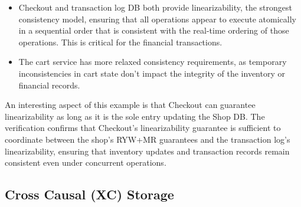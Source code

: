 \begin{itemize}
\item Checkout and transaction log DB both provide
  linearizability, the strongest consistency model, ensuring that
  all operations appear to execute atomically in a sequential order
  that is consistent with the real-time ordering of those
  operations. This is critical for the financial transactions. %

\item The cart service has more relaxed consistency requirements,
  as temporary inconsistencies in cart state don't impact the
  integrity of the inventory or financial records.
\end{itemize}

An interesting aspect of this example is that Checkout can guarantee
linearizability as long as it is the sole entry updating the Shop DB.
The verification confirms that Checkout's linearizability
guarantee is sufficient to coordinate between the shop's RYW+MR
guarantees and the transaction log's linearizability, ensuring that
inventory updates and transaction records remain consistent even
under concurrent operations.

\subsection{Cross Causal (XC) Storage}

